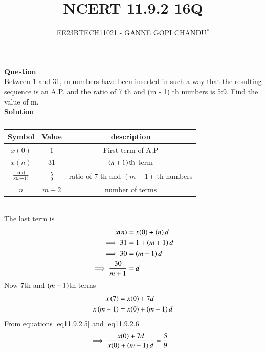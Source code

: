 \documentclass[journal,12pt,onecolumn]{IEEEtran}
\theoremstyle{remark}
\begin{document}

\vspace{3cm}
\title{NCERT 11.9.2 16Q}
\author{EE23BTECH11021 - GANNE GOPI CHANDU$^{*}$%
}
\maketitle
\bigskip
\renewcommand{\thefigure}{\theenumi}
\renewcommand{\thetable}{\theenumi}

\textbf{Question}\\
Between 1 and 31, m numbers have been inserted in such a way that the resulting sequence is an A.P. and 
the ratio of 7 th and (m - 1) th numbers is 5:9. Find the value of m.\\
\textbf{Solution}\\
\begin{table}[!h]
\begin{center}
\renewcommand\thetable{1}
\begin{tabular}{ |c|c|c| } 
  \hline
    Symbol & Value & description \\ 
  \hline
  $x(0)$ & $1$ & First term of A.P  \\ 
  \hline
  $x(n)$ & $31$ & $\left(n+1\right)\text{th}$ term \\
  \hline
  $\frac{x\left(7\right)}{x\left(m-1\right)}$ & $\frac{5}{9}$ & ratio of $7$ th  and $(m-1)$ th numbers\\ 
  \hline
  $n$ & $m+2$ & number of terms \\
  \hline
\end{tabular}
\end{center}
\caption{}
\end{table}\\
The last term is
\begin{align}
x(n)&=x(0)+\left(n\right)d\\
\implies31 &= 1 + \left(m + 1\right)d \\
\implies30 &= \left(m + 1\right)d \\
\implies\frac{30}{m + 1} &= d \label{eq11.9.2.4}
\end{align}
Now $7$th and $\left(m-1\right)$th terms
\begin{align}
x\left(7\right) &= x(0) + 7d\label{eq11.9.2.5}\\
x\left(m-1\right) &= x(0) + \left(m-1\right)d\label{eq11.9.2.6}
\end{align}
From  equations \eqref{eq11.9.2.5} and \eqref{eq11.9.2.6}\\
\begin{align}
\implies \frac{x(0) + 7d}{x(0) + \left(m-1\right)d} &= \frac{5}{9} \label{eq11.9.2.7}
\end{align}
\end{document}
